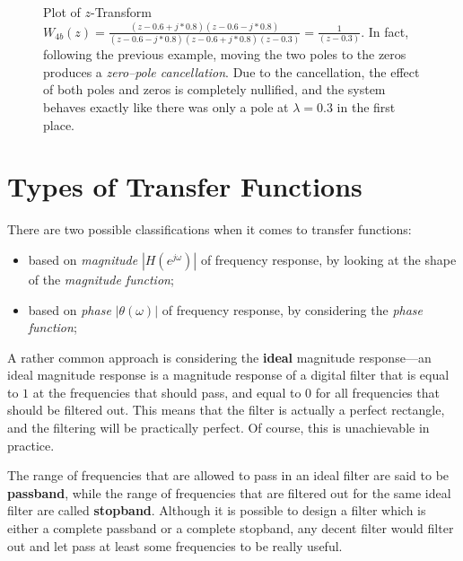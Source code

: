 \documentclass[\documentfontsize, twocolumn]{\classname}
\begin{document}
\begin{figure*}[ht]
\begin{center}
\scalebox{0.6}{
    
}\caption{Plot of $z$-Transform $W_{4b}(z) = \frac{ (z - 0.6 + j*0.8)(z - 0.6 - j*0.8) } {(z - 0.6 - j*0.8)(z - 0.6 + j*0.8)(z - 0.3)} = \frac { 1 } {(z - 0.3)}$. In fact, following the previous example, moving the two poles to the zeros produces a \emph{zero--pole cancellation}. Due to the cancellation, the effect of both poles and zeros is completely nullified, and the system behaves exactly like there was only a pole at $\lambda = 0.3$ in the first place.}\label{oct:zTransformExample4b}
\end{center}
\end{figure*}

\clearpage

\section{Types of Transfer Functions}

There are two possible classifications when it comes to transfer functions:
\begin{itemize}
    \item based on \emph{magnitude} $|H(e^{j\omega})|$ of frequency response, by looking at the shape of the \emph{magnitude function};
    \item based on \emph{phase} $|\theta(\omega)|$ of frequency response, by considering the \emph{phase function};
\end{itemize}

A rather common approach is considering the \textbf{ideal} magnitude response---an ideal magnitude response is a magnitude response of a digital filter that is equal to $1$ at the frequencies that should pass, and equal to $0$ for all frequencies that should be filtered out. This means that the filter is actually a perfect rectangle, and the filtering will be practically perfect. Of course, this is unachievable in practice.

The range of frequencies that are allowed to pass in an ideal filter are said to be \textbf{passband}, while the range of frequencies that are filtered out for the same ideal filter are called \textbf{stopband}. Although it is possible to design a filter which is either a complete passband or a complete stopband, any decent filter would filter out and let pass at least some frequencies to be really useful.
\end{document}
